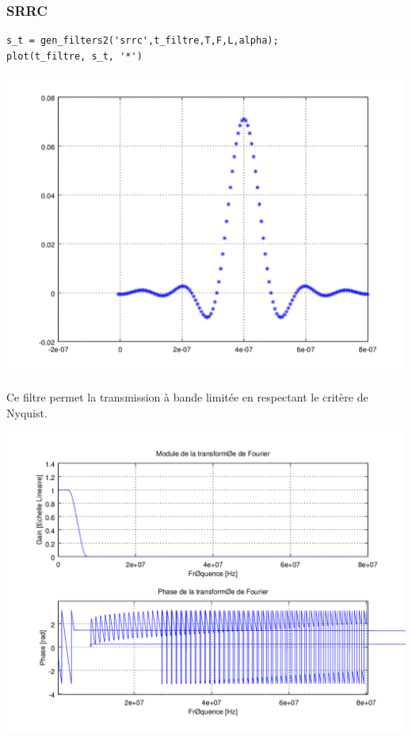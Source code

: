 \documentclass{acm_proc_article-sp}
\begin{document}
\begin{center}
\begin{center}
\subsubsection{SRRC}

\begin{center}
\begin{lstlisting}
s_t = gen_filters2('srrc',t_filtre,T,F,L,alpha);
plot(t_filtre, s_t, '*')
\end{lstlisting}

\includegraphics[scale=0.45]{SRRC_3.png}


Ce filtre permet la transmission à bande limitée en respectant le critère de Nyquist.

\begin{center}
\includegraphics[scale=0.45]{SRRC_rep_3.png}
\end{center}


\end{center}
\end{center}
\end{center}
\end{document}
